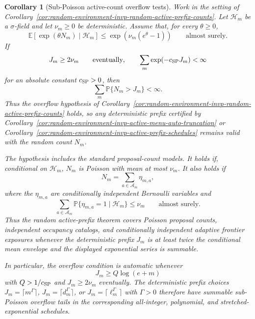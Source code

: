\documentclass[11pt]{amsart}
\numberwithin{equation}{section}
\newtheorem{corollary}[theorem]{Corollary}
\theoremstyle{definition}
\theoremstyle{remark}
\newcommand{\Prob}{\mathbb P}
\newcommand{\Exp}{\mathbb E}
\begin{document}
\begin{corollary}[Sub-Poisson active-count overflow tests]
\label{cor:random-environment-invp-subpoisson-active-counts}
Work in the setting of
Corollary~\ref{cor:random-environment-invp-random-active-prefix-counts}.  Let
\(\mathcal H_m\) be a \(\sigma\)-field and let \(\nu_m\ge0\) be deterministic.
Assume that, for every \(\theta\ge0\),
\[
  \Exp\!\left[\exp(\theta N_m)\mid\mathcal H_m\right]
  \le
  \exp\!\left(\nu_m(e^\theta-1)\right)
  \qquad\text{almost surely}.
\]
If
\[
  J_m\ge 2\nu_m
  \qquad\text{eventually},
  \qquad
  \sum_m\exp(-c_{\rm SP}J_m)<\infty
\]
for an absolute constant \(c_{\rm SP}>0\), then
\[
  \sum_m\Prob\{N_m>J_m\}<\infty .
\]
Thus the overflow hypothesis of
Corollary~\ref{cor:random-environment-invp-random-active-prefix-counts} holds,
so any deterministic prefix certified by
Corollary~\ref{cor:random-environment-invp-active-menu-auto-truncation} or
Corollary~\ref{cor:random-environment-invp-active-prefix-schedules} remains
valid with the random count \(N_m\).

The hypothesis includes the standard proposal-count models.  It holds if,
conditional on \(\mathcal H_m\), \(N_m\) is Poisson with mean at most \(\nu_m\).
It also holds if
\[
  N_m=\sum_{a\in\mathcal A_m}\eta_{m,a},
\]
where the \(\eta_{m,a}\) are conditionally independent Bernoulli variables and
\[
  \sum_{a\in\mathcal A_m}
  \Prob\{\eta_{m,a}=1\mid\mathcal H_m\}\le\nu_m
  \qquad\text{almost surely}.
\]
Thus the random active-prefix theorem covers Poisson proposal counts,
independent occupancy catalogs, and conditionally independent adaptive frontier
exposures whenever the deterministic prefix \(J_m\) is at least twice the
conditional mean envelope and the displayed exponential series is summable.

In particular, the overflow condition is automatic whenever
\[
  J_m\ge Q\log(e+m)
\]
with \(Q>1/c_{\rm SP}\) and \(J_m\ge2\nu_m\) eventually.  The deterministic
prefix choices \(J_m=\lceil m^\Gamma\rceil\),
\(J_m=\lceil d_m^\Gamma\rceil\), or \(J_m=\lceil\ell_m^\Gamma\rceil\) with
\(\Gamma>0\) therefore have summable sub-Poisson overflow tails in the
corresponding all-integer, polynomial, and stretched-exponential schedules.
\end{corollary}
\end{document}

